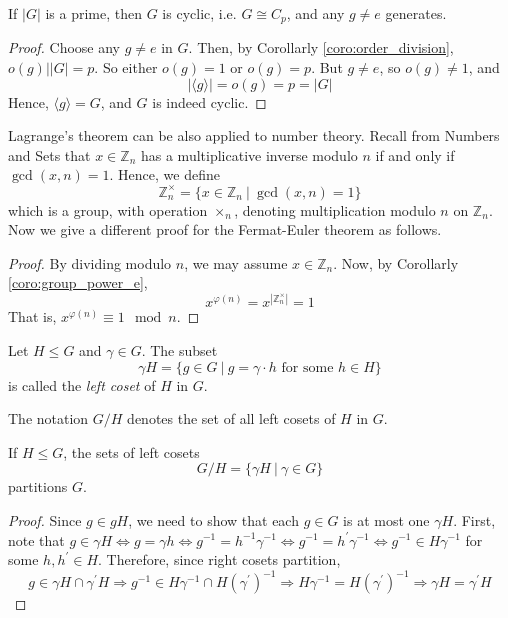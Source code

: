 \documentclass[10pt, a4paper, twoside]{report}
\begin{document}
\begin{corollary}
    If \(|G|\) is a prime, then \(G\) is cyclic, i.e. \(G\cong C_p\), and any \(g\neq e\) generates. 
\end{corollary}
\begin{proof}
    Choose any \(g\neq e\) in \(G\). Then, by Corollarly \ref{coro:order_division}, \(o(g)\big||G|=p\). So either \(o(g)=1\) or \(o(g)=p\). But \(g\neq e\), so \(o(g)\neq 1\), and 
    \[|\langle g\rangle|=o(g)=p=|G|\]
    Hence, \(\langle g\rangle =G\), and \(G\) is indeed cyclic.
\end{proof}
\begin{example}
Lagrange's theorem can be also applied to number theory. Recall from Numbers and Sets that \(x\in\mathbb{Z}_n\) has a multiplicative inverse modulo \(n\) if and only if \(\gcd(x,n)=1\). Hence, we define 
\[\mathbb{Z}_n^\times=\{x\in\mathbb{Z}_n\:|\:\gcd(x,n)=1\}\]
which is a group, with operation \(\times_n\), denoting multiplication modulo \(n\) on \(\mathbb{Z}_n\). Now we give a different proof for the Fermat-Euler theorem as follows.
\begin{proof}
    By dividing modulo \(n\), we may assume \(x\in\mathbb{Z}_n\). Now, by Corollarly \ref{coro:group_power_e},
    \[x^{\varphi(n)}=x^{|\mathbb{Z}_n^\times|}=1\]
    That is, \(x^{\varphi(n)}\equiv 1\mod n\).
\end{proof}
\end{example}
\begin{definition}
    Let \(H\leq G\) and \(\gamma\in G\). The subset 
    \[\gamma H=\{g\in G\:|\:g=\gamma\cdot h\text{  for some \(h\in H\)}\}\]
    is called the \emph{left coset} of \(H\) in \(G\).
\end{definition}
The notation \(G/H\) denotes the set of all left cosets of \(H\) in \(G\).
\begin{lemma}
    If \(H\leq G\), the sets of left cosets 
    \[G/H=\{\gamma H\:|\:\gamma\in G\}\]
    partitions \(G\).
\end{lemma}
\begin{proof}
    Since \(g\in gH\), we need to show that each \(g\in G\) is at most one \(\gamma H\). First, note that \(g\in\gamma H\Leftrightarrow g=\gamma h\Leftrightarrow g^{-1}=h^{-1}\gamma^{-1}\Leftrightarrow g^{-1}=h^\prime\gamma^{-1}\Leftrightarrow g^{-1}\in H\gamma^{-1}\) for some \(h,h^\prime\in H\). Therefore, since right cosets partition,
    \[g\in\gamma H\cap\gamma^\prime H\Rightarrow g^{-1}\in H\gamma^{-1}\cap H(\gamma^\prime)^{-1}\Rightarrow H\gamma^{-1}=H(\gamma^\prime)^{-1}\Rightarrow \gamma H=\gamma^\prime H\]
\end{proof}
\end{document}
